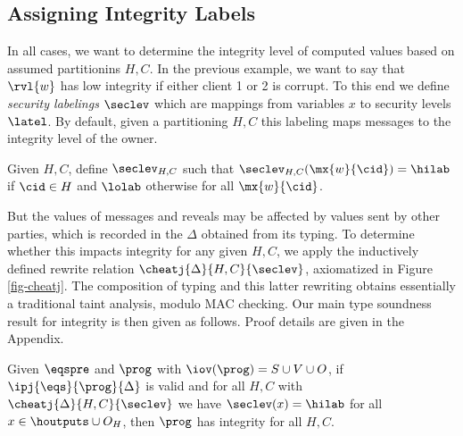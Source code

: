 \cheatjfig

\subsection{Assigning Integrity Labels}

In all cases, we want to determine the integrity level of computed
values based on assumed partitionins $H,C$. In the previous example,
we want to say that $\rvl{w}$ has low integrity if either client 1 or
2 is corrupt.  To this end we define \emph{security labelings}
$\seclev$ which are mappings from variables $x$ to security levels
$\latel$. By default, given a partitioning $H,C$ this labeling maps
messages to the integrity level of the owner.
\begin{definition}  
  Given $H,C$,
  define $\seclev_{H,C}$ such that $\seclev_{H,C}(\mx{w}{\cid} ) = \hilab$
  if $\cid \in H$  and $\lolab$
  otherwise for all $\mx{w}{\cid}$.
\end{definition}
But the values of messages and reveals may be affected by values sent
by other parties, which is recorded in the $\Delta$ obtained from its
typing. To determine whether this impacts integrity for any given
$H,C$, we apply the inductively defined rewrite relation
$\cheatj{\Delta}{H,C}{\seclev}$, axiomatized in Figure
\ref{fig-cheatj}. The composition of typing and this latter rewriting
obtains essentially a traditional taint analysis, modulo MAC checking.
Our main type soundness result for integrity is then given as follows.
Proof details are given in the Appendix.
\begin{theorem}
  \label{theorem-ipj}
  Given  $\eqspre$ and $\prog$ with
  $\iov(\prog) = S \cup V \cup O$, if
  $\ipj{\eqs}{\prog}{\Delta}$ is valid
  and for all $H,C$ with $\cheatj{\Delta}{H,C}{\seclev}$ 
  we have $\seclev(x) = \hilab$ for all $x \in \houtputs \cup O_H$, then $\prog$
  has integrity for all $H,C$.
\end{theorem}
